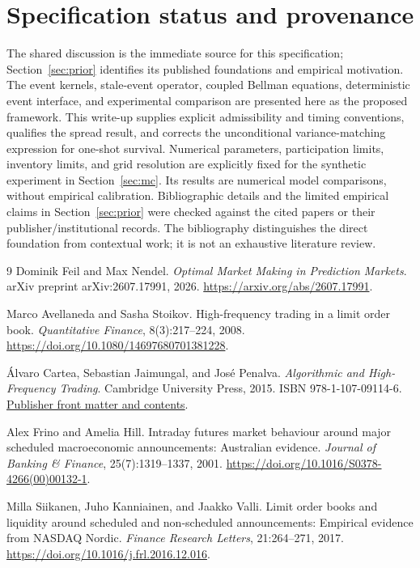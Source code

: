 \documentclass[11pt]{article}
\newcommand{\1}{\mathbf 1}
\begin{document}
\section{Specification status and provenance}
The shared discussion is the immediate source for this specification;
Section~\ref{sec:prior} identifies its published foundations and empirical
motivation. The event kernels, stale-event operator, coupled Bellman equations,
deterministic event interface, and experimental comparison are presented here
as the proposed framework. This write-up supplies explicit
admissibility and timing conventions, qualifies the spread result, and corrects
the unconditional variance-matching expression for one-shot survival. Numerical
parameters, participation limits, inventory limits, and grid resolution are
explicitly fixed for the synthetic experiment in Section~\ref{sec:mc}. Its
results are numerical model comparisons, without empirical calibration.
Bibliographic details and the limited empirical claims in Section~\ref{sec:prior}
were checked against the cited papers or their publisher/institutional records.
The bibliography distinguishes the direct foundation from contextual work;
it is not an exhaustive literature review.

\begin{thebibliography}{9}
Dominik Feil and Max Nendel.
\newblock \emph{Optimal Market Making in Prediction Markets}.
\newblock arXiv preprint arXiv:2607.17991, 2026.
\newblock \url{https://arxiv.org/abs/2607.17991}.

Marco Avellaneda and Sasha Stoikov.
\newblock High-frequency trading in a limit order book.
\newblock \emph{Quantitative Finance}, 8(3):217--224, 2008.
\newblock \url{https://doi.org/10.1080/14697680701381228}.

\'{A}lvaro Cartea, Sebastian Jaimungal, and Jos\'{e} Penalva.
\newblock \emph{Algorithmic and High-Frequency Trading}.
\newblock Cambridge University Press, 2015. ISBN 978-1-107-09114-6.
\newblock \href{https://assets.cambridge.org/97811070/91146/frontmatter/9781107091146_frontmatter.pdf}{Publisher front matter and contents}.

Alex Frino and Amelia Hill.
\newblock Intraday futures market behaviour around major scheduled
macroeconomic announcements: Australian evidence.
\newblock \emph{Journal of Banking \& Finance}, 25(7):1319--1337, 2001.
\newblock \url{https://doi.org/10.1016/S0378-4266(00)00132-1}.

Milla Siikanen, Juho Kanniainen, and Jaakko Valli.
\newblock Limit order books and liquidity around scheduled and non-scheduled
announcements: Empirical evidence from NASDAQ Nordic.
\newblock \emph{Finance Research Letters}, 21:264--271, 2017.
\newblock \url{https://doi.org/10.1016/j.frl.2016.12.016}.
\end{thebibliography}
\end{document}

